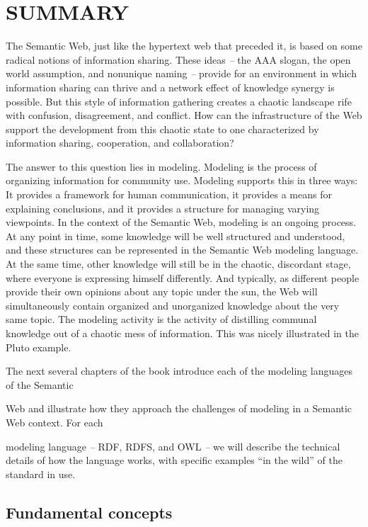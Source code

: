 \section{SUMMARY}

The Semantic Web, just like the hypertext web that preceded it, is based
on some radical notions of information sharing. These ideas \emph{--}
the AAA slogan, the open world assumption, and nonunique naming
\emph{--} provide for an environment in which information sharing can
thrive and a network effect of knowledge synergy is possible. But this
style of information gathering creates a chaotic landscape rife with
confusion, disagreement, and conflict. How can the infrastructure of the
Web support the development from this chaotic state to one characterized
by information sharing, cooperation, and collaboration?

The answer to this question lies in modeling. Modeling is the process of
organizing information for community use. Modeling supports this in
three ways: It provides a framework for human communication, it provides
a means for explaining conclusions, and it provides a structure for
managing varying viewpoints. In the context of the Semantic Web,
modeling is an ongoing process. At any point in time, some knowledge
will be well structured and understood, and these structures can be
represented in the Semantic Web modeling language. At the same time,
other knowledge will still be in the chaotic, discordant stage, where
everyone is expressing himself differently. And typically, as different
people provide their own opinions about any topic under the sun, the Web
will simultaneously contain organized and unorganized knowledge about
the very same topic. The modeling activity is the activity of distilling
communal knowledge out of a chaotic mess of information. This was nicely
illustrated in the Pluto example.

The next several chapters of the book introduce each of the modeling
languages of the Semantic

Web and illustrate how they approach the challenges of modeling in a
Semantic Web context. For each

modeling language \emph{--} RDF, RDFS, and OWL \emph{--} we will
describe the technical details of how the language works, with specific
examples ``in the wild'' of the standard in use.

\subsection{Fundamental concepts}

